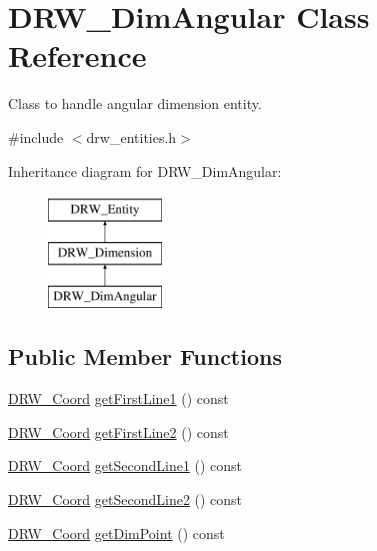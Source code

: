 \hypertarget{class_d_r_w___dim_angular}{}\section{D\+R\+W\+\_\+\+Dim\+Angular Class Reference}
\label{class_d_r_w___dim_angular}


Class to handle angular dimension entity.  




{\ttfamily \#include $<$drw\+\_\+entities.\+h$>$}

Inheritance diagram for D\+R\+W\+\_\+\+Dim\+Angular\+:\begin{figure}[H]
\begin{center}
\leavevmode
\includegraphics[height=3.000000cm]{dc/d8c/class_d_r_w___dim_angular}
\end{center}
\end{figure}
\subsection*{Public Member Functions}
\begin{DoxyCompactItemize}
\item 
\hyperlink{class_d_r_w___coord}{D\+R\+W\+\_\+\+Coord} \hyperlink{class_d_r_w___dim_angular_a19fd08973bf1c998d9c8d2ddec103d79}{get\+First\+Line1} () const 
\item 
\hyperlink{class_d_r_w___coord}{D\+R\+W\+\_\+\+Coord} \hyperlink{class_d_r_w___dim_angular_a7051a60adc2f98313877075088940c6b}{get\+First\+Line2} () const 
\item 
\hyperlink{class_d_r_w___coord}{D\+R\+W\+\_\+\+Coord} \hyperlink{class_d_r_w___dim_angular_a1733492e6857d946b5c9b1945b87227f}{get\+Second\+Line1} () const 
\item 
\hyperlink{class_d_r_w___coord}{D\+R\+W\+\_\+\+Coord} \hyperlink{class_d_r_w___dim_angular_aa242db6a477a20bb091bd3f2155b82f5}{get\+Second\+Line2} () const 
\item 
\hyperlink{class_d_r_w___coord}{D\+R\+W\+\_\+\+Coord} \hyperlink{class_d_r_w___dim_angular_a88ffb9c391ee06de48555a8defbbe732}{get\+Dim\+Point} () const 
\end{DoxyCompactItemize}

